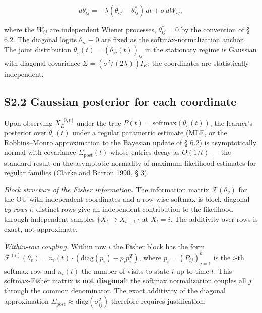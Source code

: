 \documentclass[pdflatex,sn-mathphys-ay]{sn-jnl}
\begin{document}
\begin{equation}d\theta_{ij} = -\lambda(\theta_{ij} - \theta_{ij}^*)\, dt + \sigma\, dW_{ij}, \tag{S2.1}\end{equation}



where the \(W_{ij}\) are independent Wiener processes, \(\theta_{ij}^* = 0\) by the convention of § 6.2. The diagonal logits \(\theta_{ii} \equiv 0\) are fixed as the softmax-normalization anchor. The joint distribution \(\theta_v(t) = (\theta_{ij}(t))_{ij}\) in the stationary regime is Gaussian with diagonal covariance \(\Sigma = (\sigma^2/(2\lambda)) I_K\): the coordinates are statistically independent.



\subsection*{S2.2 Gaussian posterior for each coordinate}\label{s2.2-gaussian-posterior-for-each-coordinate}



Upon observing \(X_E^{[0,t]}\) under the true \(P(t) = \text{softmax}(\theta_v(t))\), the learner's posterior over \(\theta_v(t)\) under a regular parametric estimate (MLE, or the Robbins--Monro approximation to the Bayesian update of § 6.2) is asymptotically normal with covariance \(\Sigma_{\text{post}}(t)\) whose entries decay as \(O(1/t)\) --- the standard result on the asymptotic normality of maximum-likelihood estimates for regular families (Clarke and Barron 1990, § 3).



\emph{Block structure of the Fisher information.} The information matrix \(\mathcal{F}(\theta_v)\) for the OU with independent coordinates and a row-wise softmax is block-diagonal \emph{by rows} \(i\): distinct rows give an independent contribution to the likelihood through independent samples \(\{X_t \to X_{t+1}\}\) at \(X_t = i\). The additivity over rows is exact, not approximate.



\emph{Within-row coupling.} Within row \(i\) the Fisher block has the form \(\mathcal{F}^{(i)}(\theta_v) = n_i(t) \cdot (\text{diag}(p_i) - p_i p_i^T)\), where \(p_i = (P_{ij})_{j=1}^k\) is the \(i\)-th softmax row and \(n_i(t)\) the number of visits to state \(i\) up to time \(t\). This softmax-Fisher matrix is \textbf{not diagonal}: the softmax normalization couples all \(j\) through the common denominator. The exact additivity of the diagonal approximation \(\Sigma_{\text{post}} \approx \text{diag}(\sigma_{ij}^2)\) therefore requires justification.
\end{document}
